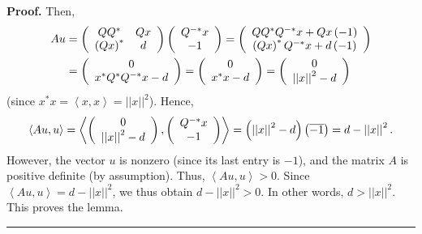 \documentclass[numbers=enddot,12pt,final,onecolumn,notitlepage]{scrartcl}%
\numberwithin{exer}{subsection}
\theoremstyle{definition}
\newenvironment{proof}[1][Proof]{\noindent\textbf{#1.} }{\ \rule{0.5em}{0.5em}}
\begin{document}
\begin{proof}
Then,%
\begin{align*}
Au  &  =\left(
\begin{array}
[c]{cc}%
QQ^{\ast} & Qx\\
\left(  Qx\right)  ^{\ast} & d
\end{array}
\right)  \left(
\begin{array}
[c]{c}%
Q^{-\ast}x\\
-1
\end{array}
\right)  =\left(
\begin{array}
[c]{c}%
QQ^{\ast}Q^{-\ast}x+Qx\left(  -1\right) \\
\left(  Qx\right)  ^{\ast}Q^{-\ast}x+d\left(  -1\right)
\end{array}
\right) \\
&  =\left(
\begin{array}
[c]{c}%
0\\
x^{\ast}Q^{\ast}Q^{-\ast}x-d
\end{array}
\right)  =\left(
\begin{array}
[c]{c}%
0\\
x^{\ast}x-d
\end{array}
\right)  =\left(
\begin{array}
[c]{c}%
0\\
\left\vert \left\vert x\right\vert \right\vert ^{2}-d
\end{array}
\right)
\end{align*}
(since $x^{\ast}x=\left\langle x,x\right\rangle =\left\vert \left\vert
x\right\vert \right\vert ^{2}$). Hence,%
\[
\left\langle Au,u\right\rangle =\left\langle \left(
\begin{array}
[c]{c}%
0\\
\left\vert \left\vert x\right\vert \right\vert ^{2}-d
\end{array}
\right)  ,\left(
\begin{array}
[c]{c}%
Q^{-\ast}x\\
-1
\end{array}
\right)  \right\rangle =\left(  \left\vert \left\vert x\right\vert \right\vert
^{2}-d\right)  \left(  \overline{-1}\right)  =d-\left\vert \left\vert
x\right\vert \right\vert ^{2}.
\]
However, the vector $u$ is nonzero (since its last entry is $-1$), and the
matrix $A$ is positive definite (by assumption). Thus, $\left\langle
Au,u\right\rangle >0$. Since $\left\langle Au,u\right\rangle =d-\left\vert
\left\vert x\right\vert \right\vert ^{2}$, we thus obtain $d-\left\vert
\left\vert x\right\vert \right\vert ^{2}>0$. In other words, $d>\left\vert
\left\vert x\right\vert \right\vert ^{2}$. This proves the lemma.
\end{proof}
\end{document}
